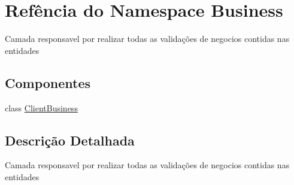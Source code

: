 \hypertarget{namespaceBusiness}{}\section{Refência do Namespace Business}
\label{namespaceBusiness}


Camada responsavel por realizar todas as validações de negocios contidas nas entidades  


\subsection*{Componentes}
\begin{DoxyCompactItemize}
\item 
class \hyperlink{classBusiness_1_1ClientBusiness}{Client\+Business}
\end{DoxyCompactItemize}


\subsection{Descrição Detalhada}
Camada responsavel por realizar todas as validações de negocios contidas nas entidades 

